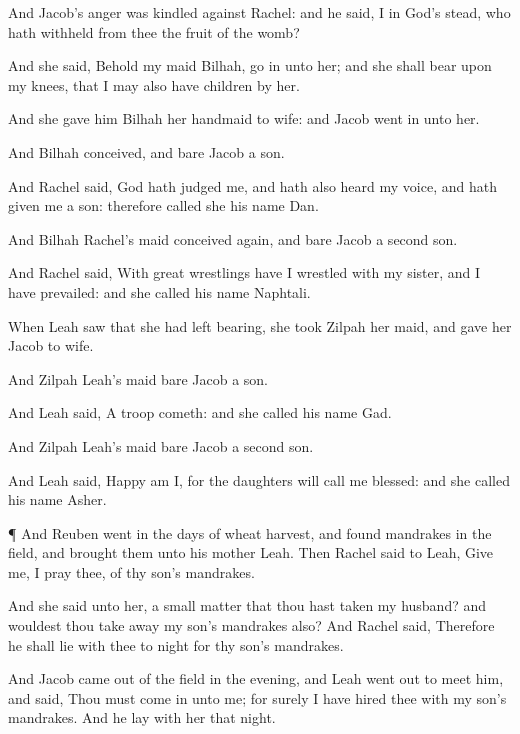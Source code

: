 {And
Jacob’s
anger was
kindled against
Rachel: and he
said,
{} I in
God’s stead, who hath
withheld from thee the
fruit of the
womb?

And she
said, Behold my
maid
Bilhah, go
in unto her; and she shall
bear upon my
knees, that I may also have
children by her.

And she
gave him
Bilhah her
handmaid to
wife: and
Jacob went
in unto her.

And
Bilhah
conceived, and
bare
Jacob a
son.

And
Rachel
said,
God hath
judged me, and hath also
heard my
voice, and hath
given me a
son: therefore
called she his
name
Dan.

And
Bilhah
Rachel’s
maid
conceived again, and
bare
Jacob a
second
son.

And
Rachel
said, With
great
wrestlings have I
wrestled with my
sister, and I have
prevailed: and she
called his
name
Naphtali.

When
Leah
saw that she had
left
bearing, she
took
Zilpah her
maid, and
gave her
Jacob to
wife.

And
Zilpah
Leah’s
maid
bare
Jacob a
son.

And
Leah
said, A
troop
cometh: and she
called his
name
Gad.

And
Zilpah
Leah’s
maid
bare
Jacob a
second
son.

And
Leah
said, Happy am
I, for the
daughters will call me
blessed: and she
called his
name
Asher.


\par }{\PP {}¶ And
Reuben went
in the
days of
wheat
harvest, and
found
mandrakes in the
field, and
brought them unto his
mother
Leah. Then
Rachel
said to
Leah, Give
me, I pray thee, of thy
son’s
mandrakes.

And she
said unto her,
{} a small
matter that thou hast
taken my
husband? and wouldest thou take
away my
son’s
mandrakes also? And
Rachel
said, Therefore he shall
lie with thee to
night
for thy
son’s
mandrakes.

And
Jacob
came out of the
field in the
evening, and
Leah went
out to
meet him, and
said, Thou must come
in unto me; for
surely I have
hired thee with my
son’s
mandrakes. And he
lay with her that
night.

}
